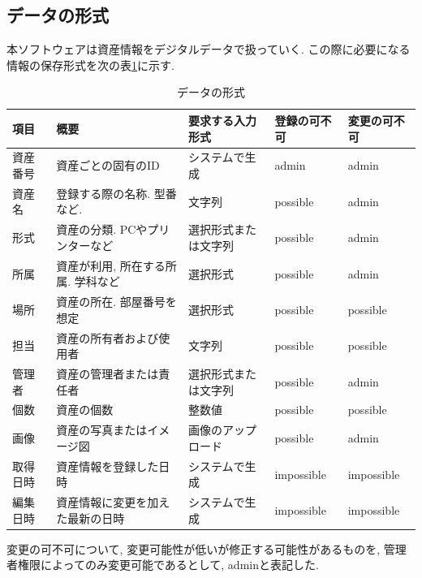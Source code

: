 \documentclass[11ptm]{jsarticle}
\begin{document}
\subsection{データの形式}
\label{subsec:データの形式}
本ソフトウェアは資産情報をデジタルデータで扱っていく. この際に必要になる情報の保存形式を次の表\ref{tb:データの形式}に示す.
\begin{table}[h]
  \caption{データの形式}
  \label{tb:データの形式}
  \centering
  \begin{tabular}{@{}l|l|l|l|l@{}}
    項目     & 概要                               & 要求する入力形式 & 登録の可不可     & 変更の可不可 \\
    \hline\hline
    資産番号 & 資産ごとの固有のID                 & システムで生成   & admin       & admin   \\
    \hline
    資産名   & 登録する際の名称. 型番など.        & 文字列     & possible               & admin        \\
    \hline
    形式     & 資産の分類. PCやプリンターなど     & 選択形式または文字列     & possible & admin        \\
    \hline
    所属     & 資産が利用, 所在する所属. 学科など & 選択形式     & possible             & admin        \\
    \hline
    場所     & 資産の所在. 部屋番号を想定         & 選択形式     & possible             & possible     \\
    \hline
    担当     & 資産の所有者および使用者           & 文字列     & possible               & possible     \\
    \hline
    管理者   & 資産の管理者または責任者           & 選択形式または文字列     & possible & admin        \\
    \hline
    個数     & 資産の個数                         & 整数値     & possible               & possible        \\
    \hline
    画像     & 資産の写真またはイメージ図         & 画像のアップロード     & possible   & admin        \\
    \hline\hline
    取得日時 & 資産情報を登録した日時             & システムで生成   & impossible       & impossible   \\
    \hline
    編集日時 & 資産情報に変更を加えた最新の日時   & システムで生成   & impossible       & impossible
  \end{tabular}
\end{table}\par
変更の可不可について, 変更可能性が低いが修正する可能性があるものを, 管理者権限によってのみ変更可能であるとして, adminと表記した.
\end{document}
